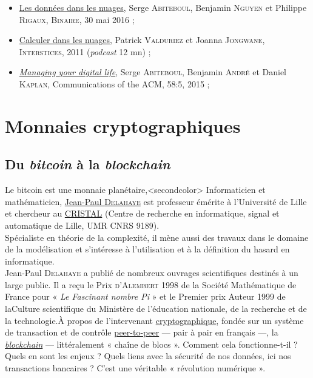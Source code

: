 \begin{gofurther}
\begin{itemize}\jazzitem
\item \href{https://www.lemonde.fr/blog/binaire/2016/05/30/les-donnees-dans-les-nuages/}{Les données dans les nuages}, Serge \textsc{Abiteboul}, Benjamin \textsc{Nguyen} et Philippe \textsc{Rigaux}, \textsc{Binaire}, 30 mai 2016 ;
\item \href{https://interstices.info/calculer-dans-les-nuages/}{Calculer dans les nuages}, Patrick \textsc{Valduriez} et Joanna \textsc{Jongwane}, \textsc{Interstices}, 2011 (\textit{podcast} 12 mn) ;
\item \href{https://dl.acm.org/doi/pdf/10.1145/2670528?download=true}{\textit{Managing your digital life}}, Serge \textsc{Abiteboul}, Benjamin \textsc{André} et Daniel \textsc{Kaplan}, Communications of the ACM, 58:5, 2015 ;
\end{itemize}
\end{gofurther}


\section[Monnaies cryptographiques]{Monnaies cryptographiques}
\label{sec:II.3}



\subsection[Du \textit{bitcoin} à la \textit{blockchain}]{Du \textit{bitcoin} à la \textit{blockchain}}
\label{sub:II.3.1}

Le \gls{bitcoin} est une monnaie planétaire,\caution[t]<secondcolor>{%
Informaticien et mathématicien, \href{http://www.lifl.fr/~jdelahay/}{Jean-Paul \textsc{Delahaye}} est professeur émérite à l'Université de Lille et chercheur au \href{https://www.cristal.univ-lille.fr/}{CRISTAL} (Centre de recherche en informatique, signal et automatique de Lille, UMR CNRS 9189).\\
Spécialiste en théorie de la complexité, il mène aussi des travaux dans le domaine de la modélisation et s'intéresse à l'utilisation et à la définition du hasard en informatique.\\
Jean-Paul \textsc{Delahaye} a publié de nombreux ouvrages scientifiques destinés à un large public. Il a reçu le Prix \textsc{d'Alembert} 1998 de la Société Mathématique de France pour « \textit{Le Fascinant nombre Pi} » et le Premier prix Auteur 1999 de la\linebreak Culture scientifique du Ministère de l'é\-ducation nationale, de la recherche et de la technologie.}{À propos de l'intervenant}
 \href{https://fr.wikipedia.org/wiki/Cryptomonnaie}{cryptographique}, fondée sur un système de transaction et de contrôle \href{https://fr.wikipedia.org/wiki/Pair_%C3%A0_pair}{peer-to-peer} --- pair à pair en français ---, la \href{https://fr.wikipedia.org/wiki/Blockchain}{\textit{blockchain}} --- littéralement « chaîne de blocs ». Comment cela fonctionne-t-il ? Quels en sont les enjeux ? Quels liens avec la  sécurité de nos données, ici nos transactions bancaires ? C'est une véritable « révolution numérique ».

